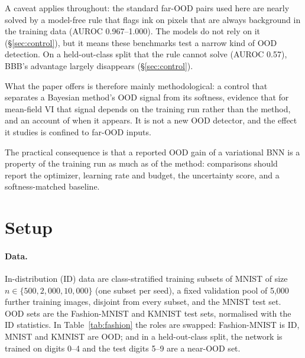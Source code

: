 \documentclass[10pt]{article}
\begin{document}
A caveat applies throughout: the standard far-OOD pairs used here are nearly
solved by a model-free rule that flags ink on pixels that are always
background in the training data (AUROC 0.967--1.000). The models do not rely on
it (\S\ref{sec:control}), but it means these benchmarks test a narrow kind of
OOD detection. On a held-out-class split that the rule cannot solve (AUROC
0.57), BBB's advantage largely disappears (\S\ref{sec:control}).

What the paper offers is therefore mainly methodological: a control that
separates a Bayesian method's OOD signal from its softness, evidence that for
mean-field VI that signal depends on the training run rather than the method,
and an account of when it appears. It is not a new OOD detector, and the
effect it studies is confined to far-OOD inputs.

The practical consequence is that a reported OOD gain of a variational BNN is
a property of the training run as much as of the method: comparisons should
report the optimizer, learning rate and budget, the uncertainty score, and a
softness-matched baseline.

\section{Setup}\label{sec:setup}
\paragraph{Data.} In-distribution (ID) data are class-stratified training
subsets of MNIST of size $n\in\{500, 2{,}000, 10{,}000\}$ (one subset per
seed), a fixed validation pool of 5{,}000 further training images, disjoint
from every subset, and the MNIST test set. OOD sets are the Fashion-MNIST
\citep{xiao2017fashion} and KMNIST \citep{clanuwat2018deep} test sets,
normalised with the ID statistics. In Table~\ref{tab:fashion} the roles are
swapped: Fashion-MNIST is ID, MNIST and KMNIST are OOD; and in a held-out-class
split, the network is trained on digits 0--4 and the test digits 5--9 are a
near-OOD set.
\end{document}

